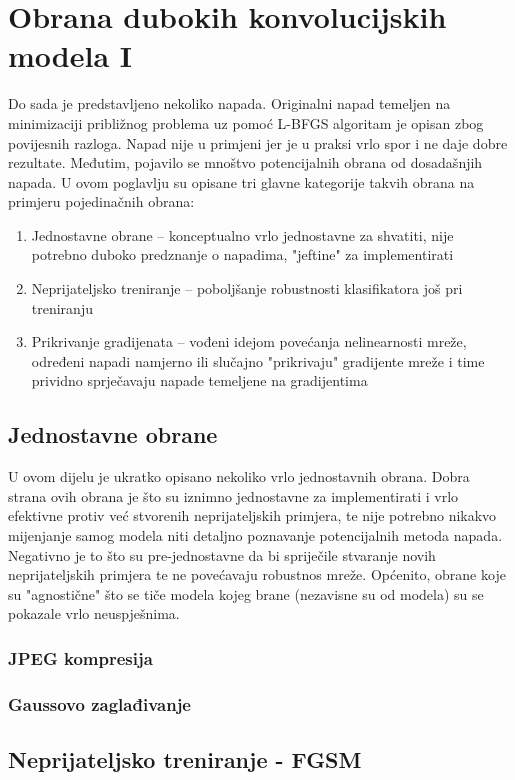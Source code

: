 \documentclass[utf8, diplomski]{fer}
\begin{document}
\chapter{Obrana dubokih konvolucijskih modela I}
Do sada je predstavljeno nekoliko napada. Originalni napad temeljen na minimizaciji približnog problema uz pomoć L-BFGS algoritam je opisan zbog povijesnih razloga. Napad nije u primjeni jer je u praksi vrlo spor i ne daje dobre rezultate. Međutim, pojavilo se mnoštvo potencijalnih obrana od dosadašnjih napada. U ovom poglavlju su opisane tri glavne kategorije takvih obrana na primjeru pojedinačnih obrana: 
\begin{enumerate}[noitemsep, label=\textbullet]
\item Jednostavne obrane -- konceptualno vrlo jednostavne za shvatiti, nije potrebno duboko predznanje o napadima, "jeftine" za implementirati
\item Neprijateljsko treniranje -- poboljšanje robustnosti klasifikatora još pri treniranju
\item Prikrivanje gradijenata -- vođeni idejom povećanja nelinearnosti mreže, određeni napadi namjerno ili slučajno "prikrivaju" gradijente mreže i time prividno sprječavaju napade temeljene na gradijentima
\end{enumerate}

\section{Jednostavne obrane}
U ovom dijelu je ukratko opisano nekoliko vrlo jednostavnih obrana. Dobra strana ovih obrana je što su iznimno jednostavne za implementirati i vrlo efektivne protiv već stvorenih neprijateljskih primjera, te nije potrebno nikakvo mijenjanje samog modela niti detaljno poznavanje potencijalnih metoda napada. Negativno je to što su pre-jednostavne da bi spriječile stvaranje novih neprijateljskih primjera te ne povećavaju robustnos mreže. Općenito, obrane koje su "agnostične" što se tiče modela kojeg brane (nezavisne su od modela) su se pokazale vrlo neuspješnima.
\subsection{JPEG kompresija}

\subsection{Gaussovo zaglađivanje}
\section{Neprijateljsko treniranje - FGSM}
\end{document}
